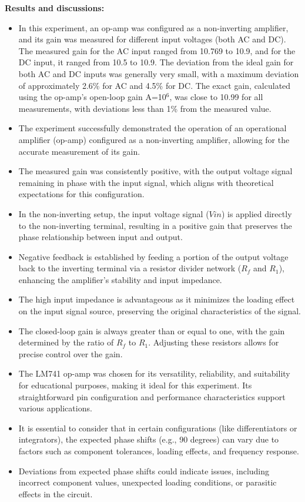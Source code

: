 \documentclass[11pt]{scrreprt}
\begin{document}
\noindent\textbf{ Results and discussions:}
\begin{itemize}

\item In this experiment, an op-amp was configured as a non-inverting amplifier, and its gain was measured for different input voltages (both AC and DC). The measured gain for the AC input ranged from 10.769 to 10.9, and for the DC input, it ranged from 10.5 to 10.9. The deviation from the ideal gain for both AC and DC inputs was generally very small, with a maximum deviation of approximately 2.6\% for AC and 4.5\% for DC. The exact gain, calculated using the op-amp’s open-loop gain A=10$^6$, was close to 10.99 for all measurements, with deviations less than 1\% from the measured value.
\item The experiment successfully demonstrated the operation of an operational amplifier (op-amp) configured as a non-inverting amplifier, allowing for the accurate measurement of its gain.

\item The measured gain was consistently positive, with the output voltage signal remaining in phase with the input signal, which aligns with theoretical expectations for this configuration.
\item In the non-inverting setup, the input voltage signal ($Vin$) is applied directly to the non-inverting terminal, resulting in a positive gain that preserves the phase relationship between input and output.

\item Negative feedback is established by feeding a portion of the output voltage back to the inverting terminal via a resistor divider network ($R_f$ and $R_1$), enhancing the amplifier's stability and input impedance.
 \item The high input impedance is advantageous as it minimizes the loading effect on the input signal source, preserving the original characteristics of the signal.

\item The closed-loop gain is always greater than or equal to one, with the gain determined by the ratio of $R_f$  to $R_1$. Adjusting these resistors allows for precise control over the gain.

\item The LM741 op-amp was chosen for its versatility, reliability, and suitability for educational purposes, making it ideal for this experiment. Its straightforward pin configuration and performance characteristics support various applications.

\item It is essential to consider that in certain configurations (like differentiators or integrators), the expected phase shifts (e.g., 90 degrees) can vary due to factors such as component tolerances, loading effects, and frequency response.

\item Deviations from expected phase shifts could indicate issues, including incorrect component values, unexpected loading conditions, or parasitic effects in the circuit.


\end{itemize}
\end{document}
